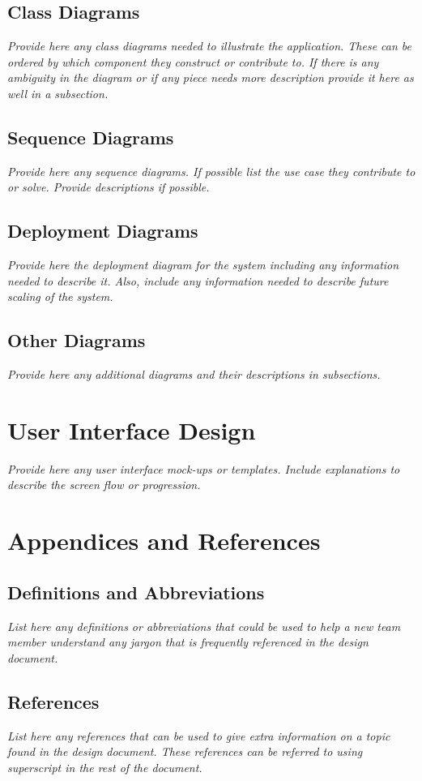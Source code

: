 \documentclass{article}
\begin{document}
\subsection{Class Diagrams}

\textit{Provide here any class diagrams needed to illustrate the application. These
can be ordered by which component they construct or contribute to. If there is
any ambiguity in the diagram or if any piece needs more description provide it
here as well in a subsection.}

\subsection{Sequence Diagrams}

\textit{Provide here any sequence diagrams. If possible list the use case they
contribute to or solve. Provide descriptions if possible.}

\subsection{Deployment Diagrams}

\textit{Provide here the deployment diagram for the system including any information
needed to describe it. Also, include any information needed to describe future
scaling of the system.}

\subsection{Other Diagrams}

\textit{Provide here any additional diagrams and their descriptions in subsections.}

\section{User Interface Design}

\textit{Provide here any user interface mock-ups or templates. Include explanations to
describe the screen flow or progression.}


\section{Appendices and References}

\subsection{Definitions and Abbreviations}

\textit{List here any definitions or abbreviations that could be used to help a new
team member understand any jargon that is frequently referenced in the design
document.}

\subsection{References}

\textit{List here any references that can be used to give extra information on a topic
found in the design document. These references can be referred to using
superscript in the rest of the document.}
\end{document}
